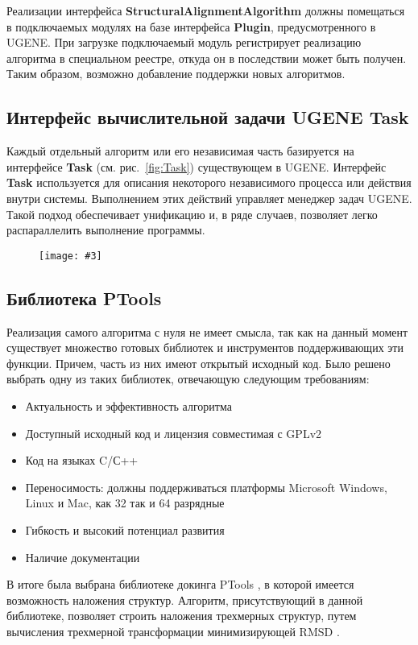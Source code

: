 \documentclass[a4paper, 12pt, titlepage, utf8]{extarticle}
\newenvironment{myfigure}[2]%
{\pushQED{\caption{#1} \label{#2}} %
    \begin{figure}[h!tb]\centering } %
{  \popQED %
    \end{figure}}
\newcommand{\includefigure}[3][]{
\begin{myfigure}{#2}{fig:#3}
    \texttt{[image: \#3]}
\end{myfigure}
}
\newcommand{\lookat}[1]{см. рис.~\ref{#1}}
\newcommand{\class}{\textbf}
\begin{document}
Реализации интерфейса \class{StructuralAlignmentAlgorithm} должны помещаться в подключаемых модулях на базе интерфейса \class{Plugin}, предусмотренного в UGENE. При загрузке подключаемый модуль регистрирует реализацию алгоритма в специальном реестре, откуда он в последствии может быть получен. Таким образом, возможно добавление поддержки новых алгоритмов.

\subsection{Интерфейс вычислительной задачи UGENE Task}
Каждый отдельный алгоритм или его независимая часть базируется на интерфейсе \class{Task} (\lookat{fig:Task}) существующем в UGENE. Интерфейс \class{Task} используется для описания некоторого независимого процесса или действия внутри системы. Выполнением этих действий управляет менеджер задач UGENE. Такой подход обеспечивает унификацию и, в ряде случаев, позволяет легко распараллелить выполнение программы.

\includefigure[scale=0.6]{Интерфейс вычислительной задачи}{Task}

\subsection{Библиотека PTools}
Реализация самого алгоритма с нуля не имеет смысла, так как на данный момент существует множество готовых библиотек и инструментов поддерживающих эти функции. Причем, часть из них имеют открытый исходный код. Было решено выбрать одну из таких библиотек, отвечающую следующим требованиям:

\begin{itemize}
    \item Актуальность и эффективность алгоритма
    \item Доступный исходный код и лицензия совместимая с GPLv2 \cite{gpl}
    \item Код на языках C/С++
    \item Переносимость: должны поддерживаться платформы Microsoft Windows, Linux и Mac, как 32 так и 64 разрядные
    \item Гибкость и высокий потенциал развития
    \item Наличие документации
\end{itemize}

В итоге была выбрана библиотеке докинга PTools \cite{ptools}, в которой имеется возможность наложения структур. Алгоритм, присутствующий в данной библиотеке, позволяет строить наложения трехмерных структур, путем вычисления трехмерной трансформации минимизирующей RMSD \cite{ptools-method}. 
\end{document}
